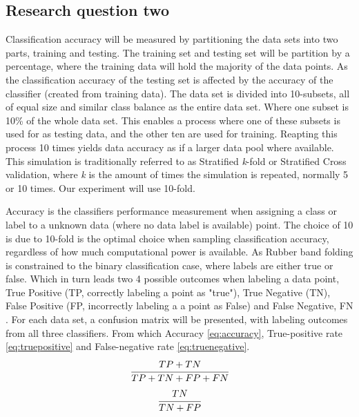 \documentclass[a4paper,twoside]{bth}
\begin{document}
\subsection{Research question two}
Classification accuracy will be measured by partitioning the data sets into two parts, training and testing. The training set and testing set will be partition by a percentage, where the training data will hold the majority of the data points. As the classification accuracy of the testing set is affected by the accuracy of the classifier (created from training data). The data set is divided into 10-subsets, all of equal size and similar class balance as the entire data set. Where one subset is 10\% of the whole data set. This enables a process where one of these subsets is used for as testing data, and the other ten are used for training. Reapting this process 10 times yields data accuracy as if a larger data pool where available. This simulation is traditionally referred to as Stratified \textit{k}-fold \cite{Flach:2012:MLA:2490546, Japkowicz:2011} or Stratified Cross validation, where \textit{k} is the amount of times the simulation is repeated, normally 5 or 10 times. Our experiment will use 10-fold.
\par Accuracy is the classifiers performance measurement when assigning a class or label to a unknown data (where no data label is available) point. The choice of 10 is due to 10-fold is the optimal choice when sampling classification accuracy, regardless of how much computational power is available\cite{Kohavi:1995:SCB:1643031.1643047}. As Rubber band folding is constrained to the binary classification case, where labels are either true or false. Which in turn leads two 4 possible outcomes when labeling a data point, True Positive (TP, correctly labeling a point as "true"), True Negative (TN), False Positive (FP, incorrectly labeling a a point as False) and False Negative, FN \cite{Japkowicz:2011}. For each data set, a confusion matrix will be presented, with labeling outcomes from all three classifiers. From which Accuracy \ref{eq:accuracy}, True-positive rate \ref{eq:truepositive} and False-negative rate \ref{eq:truenegative}.
\begin{equation}\label{eq:accuracy}
\begin{aligned}
     \cfrac{TP + TN}{TP + TN + FP + FN}
\end{aligned}
\end{equation} 
\begin{equation}\label{eq:truenegative}
\begin{aligned}
     \cfrac{TN}{TN + FP}
\end{aligned}
\end{equation} 
\end{document}
